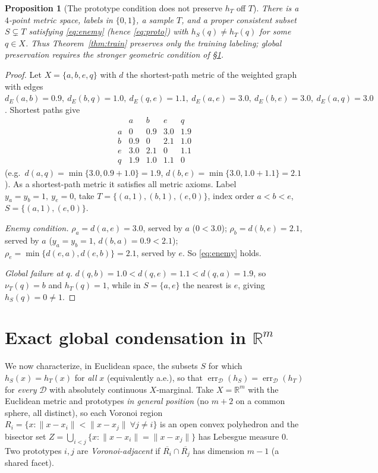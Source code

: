 \documentclass{amsart}
\newtheorem{proposition}{Proposition}
\theoremstyle{definition}
\DeclareMathOperator{\err}{err}
\begin{document}
\begin{proposition}[The prototype condition does not preserve $h_T$ off $T$]
\label{prop:gap}
There is a $4$-point metric space, labels in $\{0,1\}$, a sample $T$, and a
proper consistent subset $S\subsetneq T$ satisfying \eqref{eq:enemy} (hence
\eqref{eq:proto}) with $h_S(q)\ne h_T(q)$ for some $q\in X$. Thus
Theorem~\ref{thm:train} preserves only the training labeling; global
preservation requires the stronger geometric condition of \S\ref{sec:global}.
\end{proposition}

\begin{proof}
Let $X=\{a,b,e,q\}$ with $d$ the shortest-path metric of the weighted graph
with edges
$d_E(a,b)=0.9,\ d_E(b,q)=1.0,\ d_E(q,e)=1.1,\ d_E(a,e)=3.0,\ d_E(b,e)=3.0,\
d_E(a,q)=3.0$. Shortest paths give
\[
\begin{array}{c|cccc}
 & a & b & e & q\\\hline
a & 0 & 0.9 & 3.0 & 1.9\\
b & 0.9 & 0 & 2.1 & 1.0\\
e & 3.0 & 2.1 & 0 & 1.1\\
q & 1.9 & 1.0 & 1.1 & 0
\end{array}
\]
(e.g.\ $d(a,q)=\min\{3.0,0.9+1.0\}=1.9$, $d(b,e)=\min\{3.0,1.0+1.1\}=2.1$). As a
shortest-path metric it satisfies all metric axioms. Label $y_a=y_b=1,\ y_e=0$,
take $T=\{(a,1),(b,1),(e,0)\}$, index order $a<b<e$, $S=\{(a,1),(e,0)\}$.

\emph{Enemy condition.} $\rho_a=d(a,e)=3.0$, served by $a$ ($0<3.0$);
$\rho_b=d(b,e)=2.1$, served by $a$ ($y_a=y_b=1$, $d(b,a)=0.9<2.1$);
$\rho_e=\min\{d(e,a),d(e,b)\}=2.1$, served by $e$. So \eqref{eq:enemy} holds.

\emph{Global failure at $q$.} $d(q,b)=1.0<d(q,e)=1.1<d(q,a)=1.9$, so $\nu_T(q)=b$
and $h_T(q)=1$, while in $S=\{a,e\}$ the nearest is $e$, giving $h_S(q)=0\ne1$.
\end{proof}

\section{Exact global condensation in $\mathbb R^m$}\label{sec:global}

We now characterize, in Euclidean space, the subsets $S$ for which
$h_S(x)=h_T(x)$ for \emph{all} $x$ (equivalently a.e.), so that
$\err_\mathcal D(h_S)=\err_\mathcal D(h_T)$ for \emph{every} $\mathcal D$ with
absolutely continuous $X$-marginal. Take $X=\mathbb R^m$ with the Euclidean
metric and prototypes \emph{in general position} (no $m+2$ on a common sphere,
all distinct), so each Voronoi region
$R_i=\{x:\|x-x_i\|<\|x-x_j\|\ \forall j\ne i\}$ is an open convex polyhedron and
the bisector set $Z=\bigcup_{i<j}\{x:\|x-x_i\|=\|x-x_j\|\}$ has Lebesgue measure
$0$. Two prototypes $i,j$ are \emph{Voronoi-adjacent} if $\overline{R_i}\cap
\overline{R_j}$ has dimension $m-1$ (a shared facet).
\end{document}
